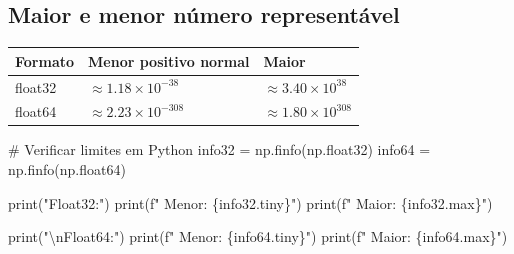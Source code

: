 \documentclass[
  11pt,
  letterpaper,
  DIV=11,
  numbers=noendperiod]{scrartcl}
\newenvironment{Shaded}{\begin{snugshade}}{\end{snugshade}}
\newcommand{\BuiltInTok}[1]{\textcolor[rgb]{0.00,0.23,0.31}{#1}}
\newcommand{\CharTok}[1]{\textcolor[rgb]{0.13,0.47,0.30}{#1}}
\newcommand{\CommentTok}[1]{\textcolor[rgb]{0.37,0.37,0.37}{#1}}
\newcommand{\NormalTok}[1]{\textcolor[rgb]{0.00,0.23,0.31}{#1}}
\newcommand{\OperatorTok}[1]{\textcolor[rgb]{0.37,0.37,0.37}{#1}}
\newcommand{\SpecialCharTok}[1]{\textcolor[rgb]{0.37,0.37,0.37}{#1}}
\newcommand{\SpecialStringTok}[1]{\textcolor[rgb]{0.13,0.47,0.30}{#1}}
\newcommand{\StringTok}[1]{\textcolor[rgb]{0.13,0.47,0.30}{#1}}
\newcounter{none} %
\begin{document}
\subsection{Maior e menor número
representável}\label{maior-e-menor-nuxfamero-representuxe1vel}

{\def\LTcaptype{none} %
\begin{longtable}[]{@{}
  >{\raggedright\arraybackslash}p{}
  >{\raggedright\arraybackslash}p{}
  >{\raggedright\arraybackslash}p{}@{}}
\toprule\noalign{}
\begin{minipage}[b]{\linewidth}\raggedright
Formato
\end{minipage} & \begin{minipage}[b]{\linewidth}\raggedright
Menor positivo normal
\end{minipage} & \begin{minipage}[b]{\linewidth}\raggedright
Maior
\end{minipage} \\
\midrule\noalign{}
\endhead
\bottomrule\noalign{}
\endlastfoot
float32 & \(\approx 1.18 \times 10^{-38}\) &
\(\approx 3.40 \times 10^{38}\) \\
float64 & \(\approx 2.23 \times 10^{-308}\) &
\(\approx 1.80 \times 10^{308}\) \\
\end{longtable}
}

\begin{Shaded}
\begin{Highlighting}[]
\CommentTok{\# Verificar limites em Python}
\NormalTok{info32 }\OperatorTok{=}\NormalTok{ np.finfo(np.float32)}
\NormalTok{info64 }\OperatorTok{=}\NormalTok{ np.finfo(np.float64)}

\BuiltInTok{print}\NormalTok{(}\StringTok{"Float32:"}\NormalTok{)}
\BuiltInTok{print}\NormalTok{(}\SpecialStringTok{f"  Menor: }\SpecialCharTok{\{}\NormalTok{info32}\SpecialCharTok{.}\NormalTok{tiny}\SpecialCharTok{\}}\SpecialStringTok{"}\NormalTok{)}
\BuiltInTok{print}\NormalTok{(}\SpecialStringTok{f"  Maior: }\SpecialCharTok{\{}\NormalTok{info32}\SpecialCharTok{.}\BuiltInTok{max}\SpecialCharTok{\}}\SpecialStringTok{"}\NormalTok{)}

\BuiltInTok{print}\NormalTok{(}\StringTok{"}\CharTok{\textbackslash{}n}\StringTok{Float64:"}\NormalTok{)}
\BuiltInTok{print}\NormalTok{(}\SpecialStringTok{f"  Menor: }\SpecialCharTok{\{}\NormalTok{info64}\SpecialCharTok{.}\NormalTok{tiny}\SpecialCharTok{\}}\SpecialStringTok{"}\NormalTok{)}
\BuiltInTok{print}\NormalTok{(}\SpecialStringTok{f"  Maior: }\SpecialCharTok{\{}\NormalTok{info64}\SpecialCharTok{.}\BuiltInTok{max}\SpecialCharTok{\}}\SpecialStringTok{"}\NormalTok{)}
\end{Highlighting}
\end{Shaded}
\end{document}
